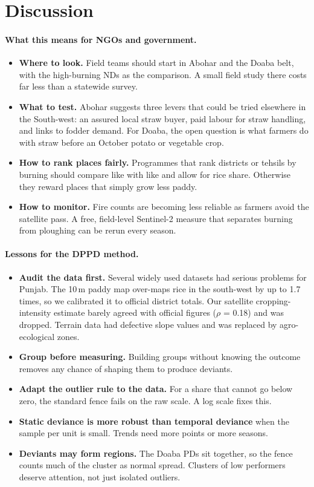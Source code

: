 \documentclass[sigconf,nonacm]{acmart}
\begin{document}
\section{Discussion}
\label{sec:discussion}

\paragraph{What this means for NGOs and government.}
\begin{itemize}
  \item \textbf{Where to look.} Field teams should start in Abohar and the Doaba belt, with the high-burning NDs as the comparison. A small field study there costs far less than a statewide survey.
  \item \textbf{What to test.} Abohar suggests three levers that could be tried elsewhere in the South-west: an assured local straw buyer, paid labour for straw handling, and links to fodder demand. For Doaba, the open question is what farmers do with straw before an October potato or vegetable crop.
  \item \textbf{How to rank places fairly.} Programmes that rank districts or tehsils by burning should compare like with like and allow for rice share. Otherwise they reward places that simply grow less paddy.
  \item \textbf{How to monitor.} Fire counts are becoming less reliable as farmers avoid the satellite pass. A free, field-level Sentinel-2 measure that separates burning from ploughing can be rerun every season.
\end{itemize}

\paragraph{Lessons for the DPPD method.}
\begin{itemize}
  \item \textbf{Audit the data first.} Several widely used datasets had serious problems for Punjab. The 10\,m paddy map over-maps rice in the south-west by up to 1.7 times, so we calibrated it to official district totals. Our satellite cropping-intensity estimate barely agreed with official figures ($\rho$ = 0.18) and was dropped. Terrain data had defective slope values and was replaced by agro-ecological zones.
  \item \textbf{Group before measuring.} Building groups without knowing the outcome removes any chance of shaping them to produce deviants.
  \item \textbf{Adapt the outlier rule to the data.} For a share that cannot go below zero, the standard fence fails on the raw scale. A log scale fixes this.
  \item \textbf{Static deviance is more robust than temporal deviance} when the sample per unit is small. Trends need more points or more seasons.
  \item \textbf{Deviants may form regions.} The Doaba PDs sit together, so the fence counts much of the cluster as normal spread. Clusters of low performers deserve attention, not just isolated outliers.
\end{itemize}
\end{document}
